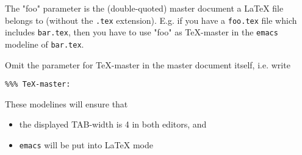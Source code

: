 The "foo" parameter is the (double-quoted) master document a
\LaTeX{} file belongs to (without the {\tt .tex} extension).
E.g. if you have a {\tt foo.tex} file which
includes {\tt bar.tex}, then you have to use "foo" as TeX-master
in the {\tt emacs} modeline of {\tt bar.tex}.

Omit the parameter for TeX-master in the master document itself, i.e.
write 

\begin{verbatim}
%%% TeX-master:
\end{verbatim}


These modelines will ensure that

\begin{itemize}
\item the displayed TAB-width is 4 in both editors, and
\item {\tt emacs} will be put into \LaTeX{} mode
\end{itemize}


